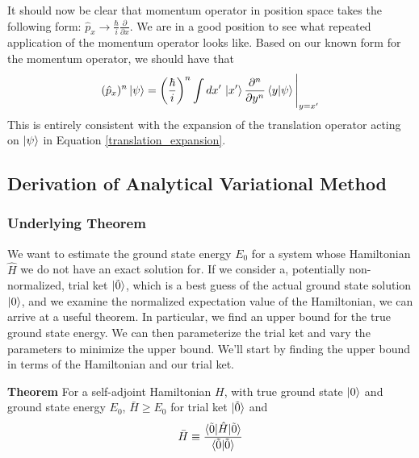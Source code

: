 \documentclass[12pt]{article}
\numberwithin{equation}{section}
\begin{document}
It should now be clear that momentum operator in position space takes the following form: $\hat{p}_x \rightarrow \frac{\hbar}{i} \frac{\partial}{\partial x}$. We are in a good position to see what repeated application of the momentum operator looks like. Based on our known form for the momentum operator, we should have that
\begin{equation}
    (\hat{p}_x)^n \ket{\psi} = \left(\frac{\hbar}{i}\right)^n \int dx' \, \ket{x'} \frac{\partial^n}{\partial y^n}\braket{y | \psi}\Bigg|_{y = x'}
\end{equation}
This is entirely consistent with the expansion of the translation operator acting on $\ket{\psi}$ in Equation \ref{translation_expansion}.


\subsection{Derivation of Analytical Variational Method}
\subsubsection{Underlying Theorem}
\hspace{1cm} We want to estimate the ground state energy $E_0$ for a system whose Hamiltonian $\hat{H}$ we do not have an exact solution for. If we consider a, potentially non-normalized, trial ket $\ket{\tilde{0}}$, which is a best guess of the actual ground state solution $\ket{0}$, and we examine the normalized expectation value of the Hamiltonian, we can arrive at a useful theorem. In particular, we find an upper bound for the true ground state energy. We can then parameterize the trial ket and vary the parameters to minimize the upper bound. We'll start by finding the upper bound in terms of the Hamiltonian and our trial ket.

\textbf{Theorem} For a self-adjoint Hamiltonian $H$, with true ground state $\ket{0}$ and ground state energy $ E_0$, $\bar{H} \ge E_0$ for trial ket $\ket{\tilde{0}}$ and 
\begin{equation}
    \bar{H} \equiv \frac{\braket{\tilde{0} | \hat{H} | \tilde{0}}}{\braket{\tilde{0} | \tilde{0}}}
\end{equation}
\end{document}
